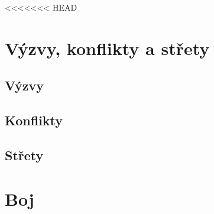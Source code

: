 \documentclass[../main.tex]{subfiles}
\begin{document}
<<<<<<< HEAD
\section{Výzvy, konflikty a střety}
\label{sec:vyzvykonflikty}

\subsection{Výzvy}
\label{sec:vyzvy}

\subsection{Konflikty}
\label{sec:konflikty}

\subsection{Střety}
\label{sec:strety}

\section{Boj}
\label{sec:boj}
\end{document}
